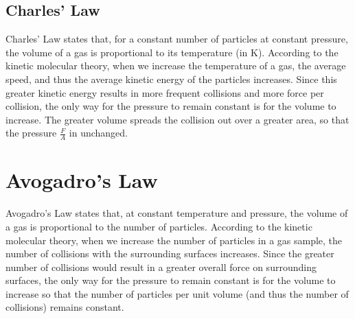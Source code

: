 \documentclass[
	chapter=5,
	title={Gases},
	showanswers=true,
]{chem122notes}
\begin{document}
\subsection{Charles' Law}\label{subsec:nature-of-pressure-charles-law}
Charles' Law states that, for a constant number of particles at constant pressure, the volume of a gas is proportional to its temperature (in K).
According to the kinetic molecular theory, when we increase the temperature of a gas, the average speed, and thus the average kinetic energy of the particles increases.
Since this greater kinetic energy results in more frequent collisions and more force per collision, the only way for the pressure to remain constant is for the volume to increase.
The greater volume spreads the collision out over a greater area, so that the pressure $\frac{F}{A}$ in unchanged.

\section{Avogadro's Law}\label{sec:avogadros-law} %
Avogadro's Law states that, at constant temperature and pressure, the volume of a gas is proportional to the number of particles.
According to the kinetic molecular theory, when we increase the number of particles in a gas sample, the number of collisions with the surrounding surfaces increases.
Since the greater number of collisions would result in a greater overall force on surrounding surfaces, the only way for the pressure to remain constant is for the volume to increase so that the number of particles per unit volume (and thus the number of collisions) remains constant.
\end{document}
